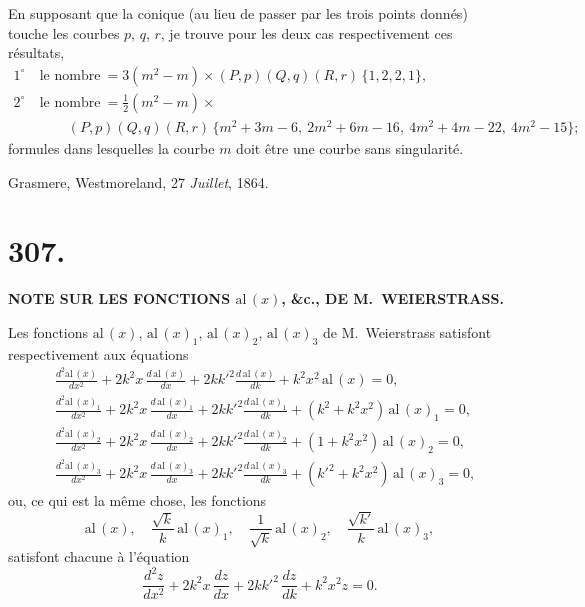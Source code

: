 \documentclass[11pt,a4paper]{article}
\begin{document}
\medskip

En supposant que la conique (au lieu de passer par les trois points donn\'{e}s) touche les courbes $p$, $q$, $r$, je trouve pour les deux cas respectivement ces r\'{e}sultats,
\begin{align*}
1^\circ\ &\text{le nombre}\ =3(m^2-m)\times(P,p)(Q,q)(R,r)\,\{1,2,2,1\}, \\
2^\circ\ &\text{le nombre}\ =\tfrac{1}{2}(m^2-m)\times \\
&\qquad (P,p)(Q,q)(R,r)\,\{m^2+3m-6,\ 2m^2+6m-16,\ 4m^2+4m-22,\ 4m^2-15\};
\end{align*}
formules dans lesquelles la courbe $m$ doit \^{e}tre une courbe sans singularit\'{e}.

\vspace{1em}
\hfill Grasmere, Westmoreland, 27 \textit{Juillet}, 1864.

\clearpage

\section*{307.}

\begin{center}
\textbf{NOTE SUR LES FONCTIONS $\mathrm{al}\,(x)$, \&c., DE M.~WEIERSTRASS.}
\end{center}

\bigskip


\bigskip

Les fonctions $\mathrm{al}\,(x)$, $\mathrm{al}\,(x)_1$, $\mathrm{al}\,(x)_2$, $\mathrm{al}\,(x)_3$ de M.~Weierstrass satisfont respectivement aux \'{e}quations
\begin{align*}
&\frac{d^2\mathrm{al}\,(x)}{dx^2}+2k^2x\,\frac{d\,\mathrm{al}\,(x)}{dx}+2kk'^2\frac{d\,\mathrm{al}\,(x)}{dk}+k^2x^2\,\mathrm{al}\,(x)=0, \\
&\frac{d^2\mathrm{al}\,(x)_1}{dx^2}+2k^2x\,\frac{d\,\mathrm{al}\,(x)_1}{dx}+2kk'^2\frac{d\,\mathrm{al}\,(x)_1}{dk}+(k^2+k^2x^2)\,\mathrm{al}\,(x)_1=0, \\
&\frac{d^2\mathrm{al}\,(x)_2}{dx^2}+2k^2x\,\frac{d\,\mathrm{al}\,(x)_2}{dx}+2kk'^2\frac{d\,\mathrm{al}\,(x)_2}{dk}+(1+k^2x^2)\,\mathrm{al}\,(x)_2=0, \\
&\frac{d^2\mathrm{al}\,(x)_3}{dx^2}+2k^2x\,\frac{d\,\mathrm{al}\,(x)_3}{dx}+2kk'^2\frac{d\,\mathrm{al}\,(x)_3}{dk}+(k'^2+k^2x^2)\,\mathrm{al}\,(x)_3=0,
\end{align*}
ou, ce qui est la m\^{e}me chose, les fonctions
\[
\mathrm{al}\,(x), \quad \frac{\sqrt{k}}{k}\,\mathrm{al}\,(x)_1, \quad \frac{1}{\sqrt{k}}\,\mathrm{al}\,(x)_2, \quad \frac{\sqrt{k'}}{k}\,\mathrm{al}\,(x)_3,
\]
satisfont chacune \`{a} l'\'{e}quation
\[
\frac{d^2z}{dx^2}+2k^2x\,\frac{dz}{dx}+2kk'^2\,\frac{dz}{dk}+k^2x^2z=0.
\]
\end{document}
